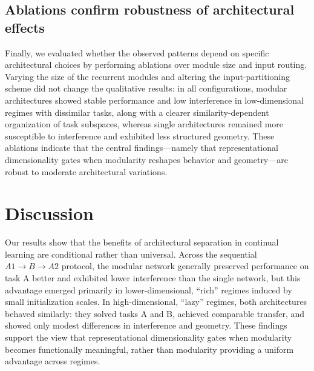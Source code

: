 \documentclass{article}
\theoremstyle{plain}
\theoremstyle{definition}
\theoremstyle{remark}
\begin{document}
\subsection{Ablations confirm robustness of architectural effects}

Finally, we evaluated whether the observed patterns depend on specific architectural choices by performing ablations over module size and input routing. Varying the size of the recurrent modules and altering the input-partitioning scheme did not change the qualitative results: in all configurations, modular architectures showed stable performance and low interference in low-dimensional regimes with dissimilar tasks, along with a clearer similarity-dependent organization of task subspaces, whereas single architectures remained more susceptible to interference and exhibited less structured geometry. These ablations indicate that the central findings—namely that representational dimensionality gates when modularity reshapes behavior and geometry—are robust to moderate architectural variations.
        
\section{Discussion}

Our results show that the benefits of architectural separation in continual learning are conditional rather than universal. Across the sequential $A1 \rightarrow B \rightarrow A2$ protocol, the modular network generally preserved performance on task A better and exhibited lower interference than the single network, but this advantage emerged primarily in lower-dimensional, ``rich'' regimes induced by small initialization scales. In high-dimensional, ``lazy'' regimes, both architectures behaved similarly: they solved tasks A and B, achieved comparable transfer, and showed only modest differences in interference and geometry. These findings support the view that representational dimensionality gates when modularity becomes functionally meaningful, rather than modularity providing a uniform advantage across regimes.
\end{document}

